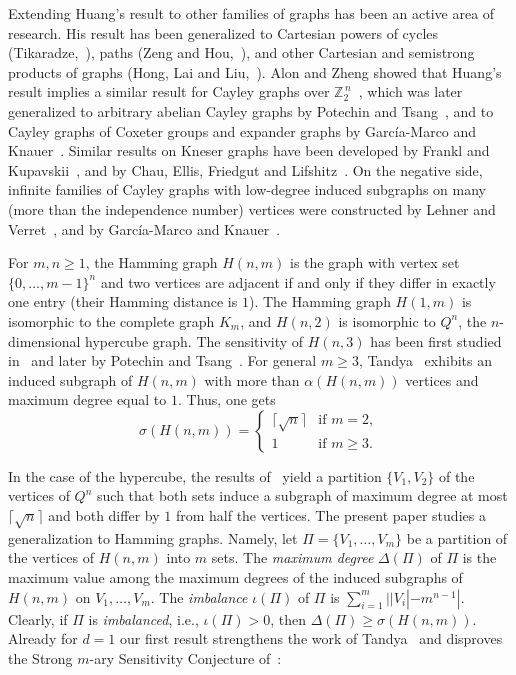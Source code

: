 \documentclass[a4paper,10pt]{amsart}
\begin{document}
Extending Huang's result to other families of graphs has been an active area of research. His result has been generalized to Cartesian powers of cycles (Tikaradze,~\cite{Tik22}), paths (Zeng and Hou,~\cite{ZH24}), and other Cartesian and semistrong products of graphs (Hong, Lai and Liu,~\cite{HLL20}). Alon and Zheng showed that Huang's result implies a similar result for Cayley graphs over $\mathbb{Z}_2^{\,n}$~\cite{AZ20}, which was later generalized to arbitrary abelian Cayley graphs by Potechin and Tsang~\cite{PT20}, and to Cayley graphs of Coxeter groups and expander graphs by García-Marco and Knauer~\cite{GMK22}. Similar results on Kneser graphs have been developed by Frankl and Kupavskii~\cite{FK20}, and by Chau, Ellis, Friedgut and Lifshitz~\cite{CEFL25}.  On the negative side, infinite families of Cayley graphs with low-degree induced subgraphs on many (more than the independence number) vertices were constructed by Lehner and Verret~\cite{LV20}, and by García-Marco and Knauer~\cite{GMK22}. 

For $m, n \geq 1$,  the Hamming graph $H(n,m)$ is the graph with vertex set $\{0,\ldots,m-1\}^n$ and two vertices are adjacent if and only if they differ in exactly one entry (their Hamming distance is $1$). The Hamming graph $H(1,m)$ is isomorphic to the complete graph $K_m$, and $H(n,2)$ is isomorphic to $Q^n$, the $n$-dimensional hypercube graph. The sensitivity of $H(n,3)$ has been first studied in~\cite{GMK22} and later by Potechin and Tsang~\cite{PT24}. For general $m \geq 3$, Tandya~\cite{T22} exhibits an induced subgraph of $H(n,m)$ with more than $\alpha(H(n,m))$ vertices and maximum degree equal to $1$. Thus, one gets \[ \sigma(H(n,m)) = 
\begin{cases}
    \lceil \sqrt{n} \rceil & \text{if } m = 2, \\
    1 & \text{if } m \ge 3.
\end{cases}
\]


In the case of the hypercube, the results of~\cite{CFGS88} yield a partition $\{V_1,V_2\}$ of the vertices of $Q^n$ such that both sets induce a subgraph of maximum degree at most $\lceil \sqrt{n} \rceil$ and both differ by $1$ from half the vertices. The present paper studies a generalization to Hamming graphs. Namely,  
let $\Pi = \{V_1,\ldots,V_m\}$ be a partition of the vertices of $H(n,m)$ into $m$ sets. The \emph{maximum degree} $\Delta(\Pi)$ of $\Pi$ is the maximum value among the maximum degrees of the induced subgraphs of $H(n,m)$ on $V_1,\ldots,V_m$. The \emph{imbalance} $\iota(\Pi)$ of $\Pi$ is $\sum_{i=1}^m||V_i|-m^{n-1}|$. 
Clearly, if $\Pi$ is \emph{imbalanced}, i.e., $\iota(\Pi)>0$, then $\Delta(\Pi) \geq \sigma(H(n,m))$. Already for $d=1$ our first result strengthens the work of Tandya~\cite{T22} and disproves the Strong $m$-ary Sensitivity Conjecture of~\cite{AGMK24}:
\end{document}
